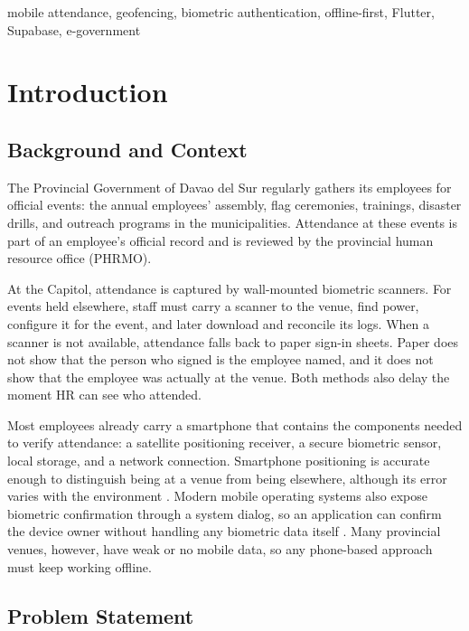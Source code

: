 \documentclass[conference]{IEEEtran}
\begin{document}
\begin{IEEEkeywords}
mobile attendance, geofencing, biometric authentication, offline-first,
Flutter, Supabase, e-government
\end{IEEEkeywords}


\section{Introduction}

\subsection{Background and Context}

The Provincial Government of Davao del Sur regularly gathers its
employees for official events: the annual employees' assembly, flag
ceremonies, trainings, disaster drills, and outreach programs in the
municipalities. Attendance at these events is part of an employee's
official record and is reviewed by the provincial human resource office
(PHRMO).

At the Capitol, attendance is captured by wall-mounted biometric
scanners. For events held elsewhere, staff must carry a scanner to the
venue, find power, configure it for the event, and later download and
reconcile its logs. When a scanner is not available, attendance falls
back to paper sign-in sheets. Paper does not show that the person who
signed is the employee named, and it does not show that the employee was
actually at the venue. Both methods also delay the moment HR can see who
attended.

Most employees already carry a smartphone that contains the components
needed to verify attendance: a satellite positioning receiver, a secure
biometric sensor, local storage, and a network connection. Smartphone
positioning is accurate enough to distinguish being at a venue from
being elsewhere, although its error varies with the environment
\cite{zandbergen2009accuracy}. Modern mobile operating systems also
expose biometric confirmation through a system dialog, so an application
can confirm the device owner without handling any biometric data itself
\cite{androidbiometric}. Many provincial venues, however, have weak or
no mobile data, so any phone-based approach must keep working offline.

\subsection{Problem Statement}
\end{document}
